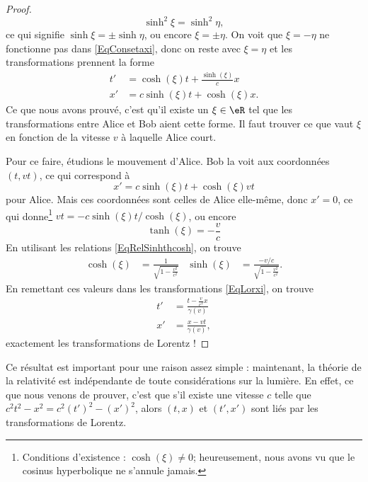 \begin{proof}
	\[ 
	  \sinh^2\xi=\sinh^2\eta,
	\]
	ce qui signifie $\sinh\xi=\pm\sinh\eta$, ou encore $\xi=\pm\eta$. On voit que $\xi=-\eta$ ne fonctionne pas dans \eqref{EqConsetaxi}, donc on reste avec $\xi=\eta$ et les transformations prennent la forme
	\begin{equation}	\label{EqLorxi}
		\begin{split}
			t'&=\cosh(\xi) t+\frac{ \sinh(\xi) }{ c }x\\
			x'&=c\sinh(\xi) t+\cosh(\xi)x.
		\end{split}
	\end{equation}
	Ce que nous avons prouvé, c'est qu'il existe un $\xi\in\eR$ tel que les transformations entre Alice et Bob aient cette forme. Il faut trouver ce que vaut $\xi$ en fonction de la vitesse $v$ à laquelle Alice court.

	Pour ce faire, étudions le mouvement d'Alice. Bob la voit aux coordonnées $(t,vt)$, ce qui correspond à
	\[ 
	  x'=c\sinh(\xi)t+\cosh(\xi)vt
	\]
	pour Alice. Mais ces coordonnées sont celles de Alice elle-même, donc $x'=0$, ce qui donne\footnote{Conditions d'existence : $\cosh(\xi)\neq 0$; heureusement, nous avons vu que le cosinus hyperbolique ne s'annule jamais.} $vt=- c\sinh(\xi)t/ \cosh(\xi)$, ou encore
	\begin{equation}
		\tanh(\xi)=-\frac{ v }{ c }
	\end{equation}
	En utilisant les relations \eqref{EqRelSinhthcosh}, on trouve
	\begin{align}
		\cosh(\xi)&=\frac{1}{ \sqrt{1-\frac{ v^2 }{ c^2 }} }&\sinh(\xi)&=\frac{ -v/c }{ \sqrt{1-\frac{ v^2 }{ c^2 }} }.
	\end{align}
	En remettant ces valeurs dans les transformations \eqref{EqLorxi}, on trouve
	\begin{align}
		t'&=\frac{ t-\frac{ v }{ c^2 }x }{ \gamma(v) }\\
		x'&=\frac{ x-vt }{ \gamma(v) },
	\end{align}
	exactement les transformations de Lorentz !

\end{proof}


Ce résultat est important pour une raison assez simple : maintenant, la théorie de la relativité est indépendante de toute considérations sur la lumière. En effet, ce que nous venons de prouver, c'est que s'il existe une vitesse $c$ telle que $c^2t^2-x^2=c^2(t')^2-(x')^2$, alors $(t,x)$ et $(t',x')$ sont liés par les transformations de Lorentz.

